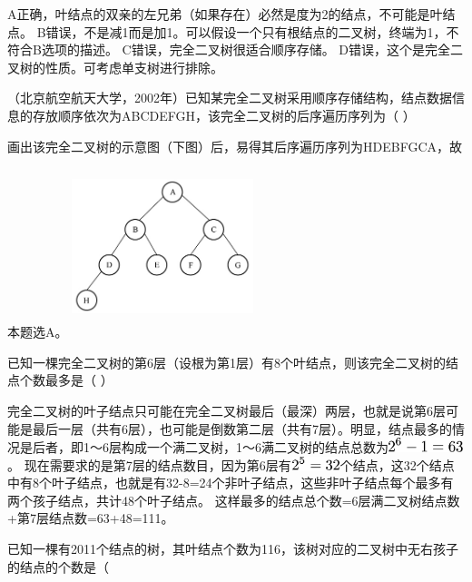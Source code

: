 \begin{solution}A正确，叶结点的双亲的左兄弟（如果存在）必然是度为2的结点，不可能是叶结点。
B错误，不是减1而是加1。可以假设一个只有根结点的二叉树，终端为1，不符合B选项的描述。
C错误，完全二叉树很适合顺序存储。
D错误，这个是完全二叉树的性质。可考虑单支树进行排除。
\end{solution}
\question （北京航空航天大学，2002年）已知某完全二叉树采用顺序存储结构，结点数据信息的存放顺序依次为ABCDEFGH，该完全二叉树的后序遍历序列为（
）
\par{}
\begin{solution}画出该完全二叉树的示意图（下图）后，易得其后序遍历序列为HDEBFGCA，故本题选A。
\includegraphics[width=2.08333in,height=2.08333in]{computerassets/82999f59b924ff27710fe8094367a64b.jpeg}
\end{solution}
\question 已知一棵完全二叉树的第6层（设根为第1层）有8个叶结点，则该完全二叉树的结点个数最多是（
）
\par{}
\begin{solution}完全二叉树的叶子结点只可能在完全二叉树最后（最深）两层，也就是说第6层可能是最后一层（共有6层），也可能是倒数第二层（共有7层）。明显，结点最多的情况是后者，即1～6层构成一个满二叉树，1～6满二叉树的结点总数为\includegraphics[width=0.85417in,height=0.16667in]{texmath/076ca35Cdpi7B3507D25E6-13D63}。
现在需要求的是第7层的结点数目，因为第6层有\includegraphics[width=0.56250in,height=0.15625in]{texmath/54f3d45Cdpi7B3507D25E53D32}个结点，这32个结点中有8个叶子结点，也就是有32-8=24个非叶子结点，这些非叶子结点每个最多有两个孩子结点，共计48个叶子结点。
这样最多的结点总个数=6层满二叉树结点数+第7层结点数=63+48=111。
\end{solution}
\question 已知一棵有2011个结点的树，其叶结点个数为116，该树对应的二叉树中无右孩子的结点的个数是（
